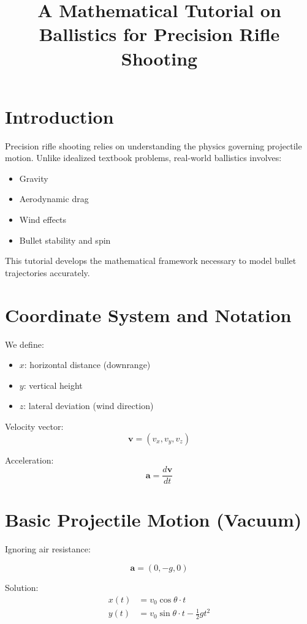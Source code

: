 \documentclass[11pt]{article}
\title{A Mathematical Tutorial on Ballistics for Precision Rifle Shooting}
\author{}
\date{}
\begin{document}
	
	\maketitle
	
	\tableofcontents
	
	\newpage
	
	\section{Introduction}
	
	Precision rifle shooting relies on understanding the physics governing projectile motion. Unlike idealized textbook problems, real-world ballistics involves:
	\begin{itemize}
		\item Gravity
		\item Aerodynamic drag
		\item Wind effects
		\item Bullet stability and spin
	\end{itemize}
	
	This tutorial develops the mathematical framework necessary to model bullet trajectories accurately.
	
	\section{Coordinate System and Notation}
	
	We define:
	\begin{itemize}
		\item $x$: horizontal distance (downrange)
		\item $y$: vertical height
		\item $z$: lateral deviation (wind direction)
	\end{itemize}
	
	Velocity vector:
	\[
	\bm{v} = (v_x, v_y, v_z)
	\]
	
	Acceleration:
	\[
	\bm{a} = \frac{d\bm{v}}{dt}
	\]
	
	\section{Basic Projectile Motion (Vacuum)}
	
	Ignoring air resistance:
	
	\[
	\bm{a} = (0, -g, 0)
	\]
	
	Solution:
	\begin{align}
		x(t) &= v_0 \cos\theta \cdot t \\
		y(t) &= v_0 \sin\theta \cdot t - \frac{1}{2}gt^2
	\end{align}
	
\end{document}
